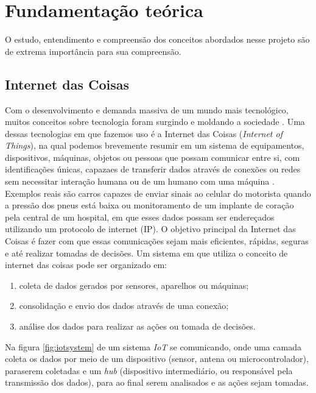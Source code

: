 \documentclass[../../layout.tex]{subfiles}
\begin{document}
\chapter{Fundamentação teórica}
\hspace*{3em}O estudo, entendimento e compreensão dos conceitos abordados nesse projeto são de extrema importância para sua compreensão.

\section{Internet das Coisas}
\hspace*{3em}Com o desenvolvimento e demanda massiva de um mundo mais tecnológico, muitos conceitos sobre tecnologia foram surgindo e moldando a sociedade . Uma dessas tecnologias em que fazemos uso é a Internet das Coisas (\emph{Internet of Things}), na qual podemos brevemente resumir em um sistema de equipamentos, dispositivos, máquinas, objetos ou pessoas que possam comunicar entre si, com identificações únicas, capazaes de transferir dados através de conexões ou redes sem necessitar interação humana ou de um humano com uma máquina \cite{iot}. Exemplos reais são carros capazes de enviar sinais ao celular do motorista quando a pressão dos pneus está baixa ou monitoramento de um implante de coração pela central de um hospital, em que esses dados possam ser endereçados utilizando um protocolo de internet (IP). O objetivo principal da Internet das Coisas é fazer com que essas comunicações sejam mais eficientes, rápidas, seguras e até realizar tomadas de decisões. Um sistema em que utiliza o conceito de internet das coisas pode ser organizado em:

\begin{enumerate}[label=\alph*)]
\itemsep0em
\item coleta de dados gerados por sensores, aparelhos ou máquinas;
\item consolidação e envio dos dados através de uma conexão;
\item análise dos dados para realizar as ações ou tomada de decisões.
\end{enumerate}

\hspace*{3em} Na figura \ref{fig:iotsystem} de um sistema \emph{IoT} se comunicando, onde uma camada coleta os dados por meio de um dispositivo (sensor, antena ou microcontrolador), paraserem coletadas e um \emph{hub} (dispositivo intermediário, ou responsável pela transmissão dos dados), para ao final serem analisados e as ações sejam tomadas.
\end{document}
